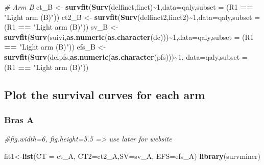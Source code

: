\documentclass[
]{article}
\newenvironment{Shaded}{\begin{snugshade}}{\end{snugshade}}
\newcommand{\AttributeTok}[1]{\textcolor[rgb]{0.13,0.29,0.53}{#1}}
\newcommand{\CommentTok}[1]{\textcolor[rgb]{0.56,0.35,0.01}{\textit{#1}}}
\newcommand{\DecValTok}[1]{\textcolor[rgb]{0.00,0.00,0.81}{#1}}
\newcommand{\FunctionTok}[1]{\textcolor[rgb]{0.13,0.29,0.53}{\textbf{#1}}}
\newcommand{\NormalTok}[1]{#1}
\newcommand{\OtherTok}[1]{\textcolor[rgb]{0.56,0.35,0.01}{#1}}
\newcommand{\SpecialCharTok}[1]{\textcolor[rgb]{0.81,0.36,0.00}{\textbf{#1}}}
\newcommand{\StringTok}[1]{\textcolor[rgb]{0.31,0.60,0.02}{#1}}
\begin{document}
\begin{Shaded}
\begin{Highlighting}[]
\CommentTok{\# Arm B}
\NormalTok{ct\_B  }\OtherTok{\textless{}{-}} \FunctionTok{survfit}\NormalTok{(}\FunctionTok{Surv}\NormalTok{(delfinct,finct)}\SpecialCharTok{\textasciitilde{}}\DecValTok{1}\NormalTok{,}\AttributeTok{data=}\NormalTok{qaly,}\AttributeTok{subset =}\NormalTok{ (R1 }\SpecialCharTok{==} \StringTok{"Light arm (B)"}\NormalTok{))}
\NormalTok{ct2\_B  }\OtherTok{\textless{}{-}} \FunctionTok{survfit}\NormalTok{(}\FunctionTok{Surv}\NormalTok{(delfinct2,finct2)}\SpecialCharTok{\textasciitilde{}}\DecValTok{1}\NormalTok{,}\AttributeTok{data=}\NormalTok{qaly,}\AttributeTok{subset =}\NormalTok{ (R1 }\SpecialCharTok{==} \StringTok{"Light arm (B)"}\NormalTok{))}
\NormalTok{sv\_B  }\OtherTok{\textless{}{-}} \FunctionTok{survfit}\NormalTok{(}\FunctionTok{Surv}\NormalTok{(suivi,}\FunctionTok{as.numeric}\NormalTok{(}\FunctionTok{as.character}\NormalTok{(dc)))}\SpecialCharTok{\textasciitilde{}}\DecValTok{1}\NormalTok{,}\AttributeTok{data=}\NormalTok{qaly,}\AttributeTok{subset =}\NormalTok{ (R1 }\SpecialCharTok{==} \StringTok{"Light arm (B)"}\NormalTok{))}
\NormalTok{efs\_B }\OtherTok{\textless{}{-}} \FunctionTok{survfit}\NormalTok{(}\FunctionTok{Surv}\NormalTok{(delpfs,}\FunctionTok{as.numeric}\NormalTok{(}\FunctionTok{as.character}\NormalTok{(pfs)))}\SpecialCharTok{\textasciitilde{}}\DecValTok{1}\NormalTok{, }\AttributeTok{data=}\NormalTok{qaly,}\AttributeTok{subset =}\NormalTok{ (R1 }\SpecialCharTok{==} \StringTok{"Light arm (B)"}\NormalTok{))}
\end{Highlighting}
\end{Shaded}

\hypertarget{plot-the-survival-curves-for-each-arm}{%
\subsection{Plot the survival curves for each
arm}\label{plot-the-survival-curves-for-each-arm}}

\hypertarget{bras-a}{%
\subsubsection{Bras A}\label{bras-a}}

\begin{Shaded}
\begin{Highlighting}[]
\CommentTok{\#fig.width=6, fig.height=5.5 =\textgreater{} use later for website}

\NormalTok{fit1}\OtherTok{\textless{}{-}}\FunctionTok{list}\NormalTok{(}\AttributeTok{CT =}\NormalTok{ ct\_A, }\AttributeTok{CT2=}\NormalTok{ct2\_A,}\AttributeTok{SV=}\NormalTok{sv\_A, }\AttributeTok{EFS=}\NormalTok{efs\_A)}
\FunctionTok{library}\NormalTok{(survminer)}
\end{Highlighting}
\end{Shaded}
\end{document}
